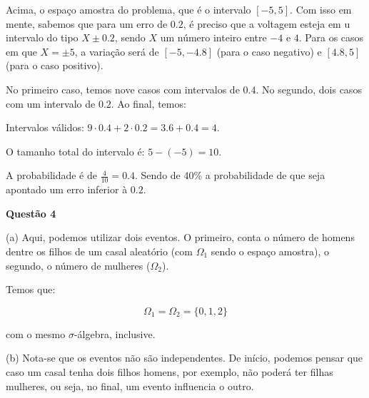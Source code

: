 \documentclass[11pt,a4paper]{article}
\begin{document}
\vspace{\baselineskip}
Acima, o espaço amostra do problema, que é o intervalo $[-5, 5]$. Com isso em mente, sabemos que para um erro de $0.2$, é preciso que a voltagem esteja em u intervalo do tipo $X \pm 0.2$, sendo $X$ um número inteiro entre $-4$ e $4$. Para os casos em que $X = \pm 5$, a variação será de $[-5, -4.8]$ (para o caso negativo) e $[4.8, 5]$ (para o caso positivo).

No primeiro caso, temos nove casos com intervalos de $0.4$. No segundo, dois casos com um intervalo de $0.2$. Ao final, temos:

Intervalos válidos: $9 \cdot 0.4 + 2 \cdot 0.2 = 3.6 + 0.4 = 4$.

O tamanho total do intervalo é: $5 - (-5) = 10$.

A probabilidade é de $\frac{4}{10} = 0.4$. Sendo de 40\% a probabilidade de que seja apontado um erro inferior à $0.2$.

\newpage

{\large{\textbf{Questão 4}}}

(a) Aqui, podemos utilizar dois eventos. O primeiro, conta o número de homens dentre os filhos de um casal aleatório (com $\Omega_{1}$ sendo  o espaço amostra), o segundo, o número de mulheres ($\Omega_{2}$).

Temos que:

\[\Omega_{1} = \Omega_{2} = \{0, 1, 2\}\]

com o mesmo $\sigma$-álgebra, inclusive.

\vspace{\baselineskip}


\vspace{\baselineskip}
\vspace{\baselineskip}

(b) Nota-se que os eventos não são independentes. De início, podemos pensar que caso um casal tenha dois filhos homens, por exemplo, não poderá ter filhas mulheres, ou seja, no final, um evento influencia o outro.
\end{document}
